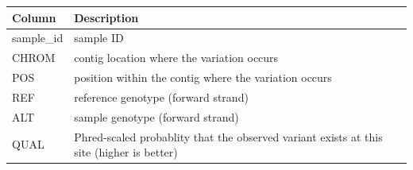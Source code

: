 \documentclass[]{book}
\begin{document}
\begin{longtable}[]{@{}ll@{}}
\toprule
\begin{minipage}[b]{0.09\columnwidth}\raggedright
Column\strut
\end{minipage} & \begin{minipage}[b]{0.85\columnwidth}\raggedright
Description\strut
\end{minipage}\tabularnewline
\midrule
\endhead
\begin{minipage}[t]{0.09\columnwidth}\raggedright
sample\_id\strut
\end{minipage} & \begin{minipage}[t]{0.85\columnwidth}\raggedright
sample ID\strut
\end{minipage}\tabularnewline
\begin{minipage}[t]{0.09\columnwidth}\raggedright
CHROM\strut
\end{minipage} & \begin{minipage}[t]{0.85\columnwidth}\raggedright
contig location where the variation occurs\strut
\end{minipage}\tabularnewline
\begin{minipage}[t]{0.09\columnwidth}\raggedright
POS\strut
\end{minipage} & \begin{minipage}[t]{0.85\columnwidth}\raggedright
position within the contig where the variation occurs\strut
\end{minipage}\tabularnewline
\begin{minipage}[t]{0.09\columnwidth}\raggedright
REF\strut
\end{minipage} & \begin{minipage}[t]{0.85\columnwidth}\raggedright
reference genotype (forward strand)\strut
\end{minipage}\tabularnewline
\begin{minipage}[t]{0.09\columnwidth}\raggedright
ALT\strut
\end{minipage} & \begin{minipage}[t]{0.85\columnwidth}\raggedright
sample genotype (forward strand)\strut
\end{minipage}\tabularnewline
\begin{minipage}[t]{0.09\columnwidth}\raggedright
QUAL\strut
\end{minipage} & \begin{minipage}[t]{0.85\columnwidth}\raggedright
Phred-scaled probablity that the observed variant exists at this site (higher is better)\strut
\end{minipage}\tabularnewline

\end{longtable}
\end{document}
